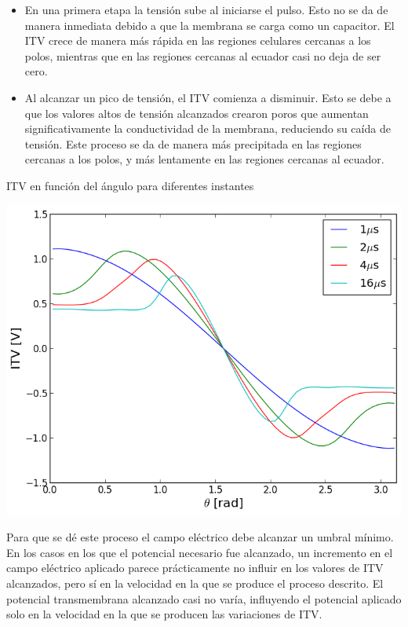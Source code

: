 \documentclass[a0,portrait]{a0poster}
\begin{document}
\begin{multicols}{2}
\begin{itemize}
	\item En una primera etapa la tensión sube al iniciarse el pulso. Esto no se da de manera inmediata debido a que la membrana se carga como un capacitor. El ITV crece de manera más rápida en las regiones celulares cercanas a los polos, mientras que en las regiones cercanas al ecuador casi no deja de ser cero.
	\item Al alcanzar un pico de tensión, el ITV comienza a disminuir. Esto se debe a que los valores altos de tensión alcanzados crearon poros que aumentan significativamente la conductividad de la membrana, reduciendo su caída de tensión. Este proceso se da de manera más precipitada en las regiones cercanas a los polos, y más lentamente en las regiones cercanas al ecuador. 
\end{itemize}

\begin{multicols}{2}
	ITV en función del ángulo para diferentes instantes
	\begin{center}\vspace{1cm}
	\includegraphics[width=1\linewidth]{itv-tita-50-64-80KVm}
	\end{center}\vspace{1cm}
	
\columnbreak
	Para que se dé este proceso el campo eléctrico debe alcanzar un umbral mínimo. En los casos en los que el potencial necesario fue alcanzado, un incremento en el campo eléctrico aplicado parece prácticamente no influir en los valores de ITV alcanzados, pero sí en la velocidad en la que se produce el proceso descrito. El potencial transmembrana alcanzado casi no varía, influyendo el potencial aplicado solo en la velocidad en la que se producen las variaciones de ITV.\\
\end{multicols}



\end{multicols}
\end{document}
